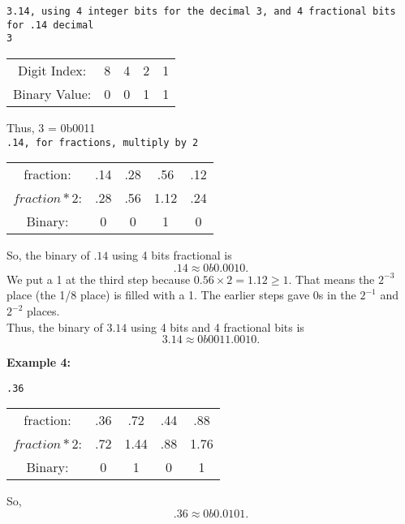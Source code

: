 \documentclass{article}
\begin{document}
\texttt{3.14, using 4 integer bits for the decimal 3, and 4 fractional bits for .14 decimal } \\

\texttt{3}

\begin{center}
\begin{tabular}{c c c c c}
Digit Index: & 8 & 4 & 2 & 1 \\
Binary Value: & 0 & 0 & 1 & 1 \\
\end{tabular}
\end{center}

\noindent Thus, 3 = 0b0011 \\

\texttt{.14, for fractions, multiply by 2}

\begin{center}
\begin{tabular}{c c c c c}
fraction: & .14 & .28 & .56 & .12 \\
$fraction * 2$: & .28 & .56 & 1.12 & .24 \\
Binary: & 0 & 0 & 1 & 0 \\
\end{tabular}
\end{center}

\noindent So, the binary of $.14$ using 4 bits fractional is 
\[
.14 \approx 0b0.0010.
\]
We put a 1 at the third step because $0.56 \times 2 = 1.12 \geq 1$.  
That means the $2^{-3}$ place (the 1/8 place) is filled with a 1.  
The earlier steps gave 0s in the $2^{-1}$ and $2^{-2}$ places. \\

\noindent Thus, the binary of $3.14$ using 4 bits and 4 fractional bits is 
\[
3.14 \approx 0b0011.0010. 
\]

\noindent \textbf{Example 4:}

\texttt{.36 } \\

\begin{center}
\begin{tabular}{c c c c c}
fraction: & .36 & .72 & .44 & .88 \\
$fraction * 2$: & .72 & 1.44 & .88 & 1.76 \\
Binary: & 0 & 1 & 0 & 1 \\
\end{tabular}
\end{center}

\noindent So,
\[
.36 \approx 0b0.0101.
\]
\end{document}
